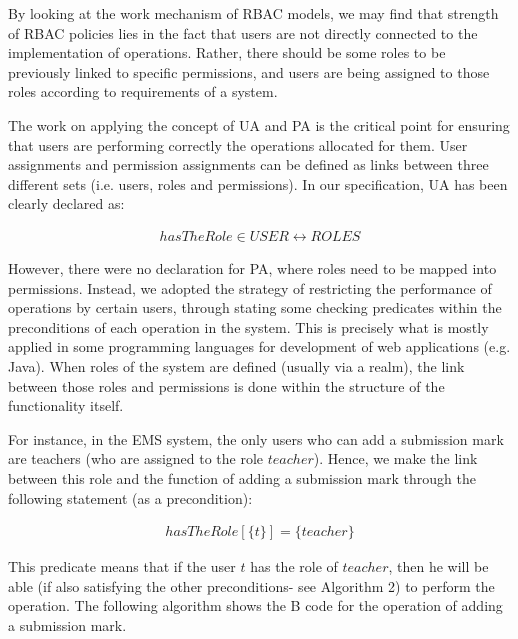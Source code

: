 By looking at the work mechanism of RBAC models, we may find that strength of RBAC policies lies in the fact that users are not directly connected to the implementation of operations. Rather, there should be some roles to be previously linked to specific permissions, and users are being assigned to those roles according to requirements of a system. 

The work on applying the concept of UA and PA is the critical point for ensuring that users are performing correctly the operations allocated for them.  User assignments and permission assignments can be defined as links between three different sets (i.e. users, roles and permissions).  In our specification, UA has been clearly declared as:
          

\begin{align*}
hasTheRole \in USER \leftrightarrow ROLES
\end{align*}


However, there were no declaration for PA, where roles need to be mapped into permissions.  Instead, we adopted the strategy of restricting the performance of operations by certain users, through stating some checking predicates within the preconditions of each operation in the system.  This is precisely what is mostly applied in some programming languages for development of web applications (e.g. Java). When roles of the system are defined (usually via a realm), the link between those roles and permissions is done within the structure of the functionality itself.  

For instance, in the EMS system, the only users who can add a submission mark are teachers (who are assigned to the role $teacher$).  Hence, we make the link between this role and the function of adding a submission mark through the following statement (as a precondition): 


\begin{align*}
hasTheRole[\{t\}] = \{teacher\} 
\end{align*}



This predicate means that if the user $t$ has the role of $teacher$, then he will be able (if also satisfying the other preconditions- see Algorithm 2) to perform the operation.  The following algorithm shows the B code for the operation of adding a submission mark.


